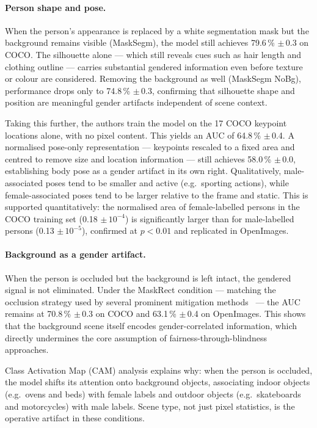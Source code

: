 \paragraph{Person shape and pose.}
When the person's appearance is replaced by a white segmentation mask but the background
remains visible (MaskSegm), the model still achieves 79.6\,\% $\pm$\,0.3 on COCO.  The
silhouette alone --- which still reveals cues such as hair length and clothing outline ---
carries substantial gendered information even before texture or colour are considered.
Removing the background as well (MaskSegm NoBg), performance drops only to 74.8\,\%
$\pm$\,0.3, confirming that silhouette shape and position are meaningful gender artifacts
independent of scene context.

Taking this further, the authors train the model on the 17 COCO keypoint locations alone,
with no pixel content.  This yields an AUC of 64.8\,\% $\pm$\,0.4.  A normalised pose-only
representation --- keypoints rescaled to a fixed area and centred to remove size and location
information --- still achieves 58.0\,\% $\pm$\,0.0, establishing body pose as a gender
artifact in its own right.  Qualitatively, male-associated poses tend to be smaller and
active (e.g.\ sporting actions), while female-associated poses tend to be larger relative to
the frame and static.  This is supported quantitatively: the normalised area of
female-labelled persons in the COCO training set (0.18 $\pm$\,$10^{-4}$) is significantly
larger than for male-labelled persons (0.13 $\pm$\,$10^{-5}$), confirmed at $p < 0.01$ and
replicated in OpenImages.

\paragraph{Background as a gender artifact.}
When the person is occluded but the background is left intact, the gendered signal is not
eliminated.  Under the MaskRect condition --- matching the occlusion strategy used by several
prominent mitigation methods~\cite{Burns_2018_WomenAlsoSnowboard,Wang_2019_BalancedDatasetsNotEnough}
--- the AUC remains at 70.8\,\% $\pm$\,0.3 on COCO and 63.1\,\% $\pm$\,0.4 on OpenImages.
This shows that the background scene itself encodes gender-correlated information, which
directly undermines the core assumption of fairness-through-blindness approaches.

Class Activation Map (CAM) analysis explains why: when the person is occluded, the model
shifts its attention onto background objects, associating indoor objects (e.g.\ ovens and
beds) with female labels and outdoor objects (e.g.\ skateboards and motorcycles) with male
labels.  Scene type, not just pixel statistics, is the operative artifact in these
conditions.

